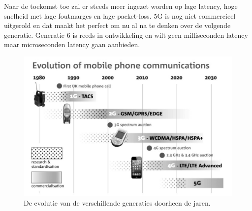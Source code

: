 \documentclass{article}
\begin{document}
\noindent Naar de toekomst toe zal er steeds meer ingezet worden op lage latency, hoge snelheid met lage foutmarges en lage packet-loss. 5G is nog niet commercieel uitgerold en dat maakt het perfect om nu al na te denken over de volgende generatie. Generatie 6 is reeds in ontwikkeling en wilt geen milliseconden latency maar microseconden latency gaan aanbieden.\\




\begin{figure}[H]
\centering
\includegraphics[width=0.95 \textwidth]{img/evolution.jpg}
\caption{De evolutie van de verschillende generaties doorheen de jaren.}
\label{fig:evolution}
\end{figure}
\newpage
\end{document}
